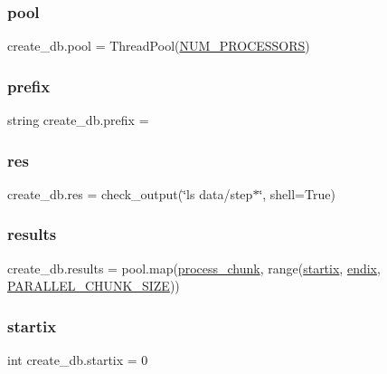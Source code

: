\subsubsection{\texorpdfstring{pool}{pool}}
{\footnotesize\ttfamily create\+\_\+db.\+pool = Thread\+Pool(\hyperlink{namespacecreate__db_a2da1873dcc0f1772f769b24a8afb0cc9}{N\+U\+M\+\_\+\+P\+R\+O\+C\+E\+S\+S\+O\+RS})}

\mbox{\label{namespacecreate__db_a3618610b83bddd5732bbdb1707b93c54}} 
\subsubsection{\texorpdfstring{prefix}{prefix}}
{\footnotesize\ttfamily string create\+\_\+db.\+prefix = \textquotesingle{}\textquotesingle{}}

\mbox{\label{namespacecreate__db_aa349dd30992f59754d744dd90a252664}} 
\subsubsection{\texorpdfstring{res}{res}}
{\footnotesize\ttfamily create\+\_\+db.\+res = check\+\_\+output(\char`\"{}ls data/step$\ast$\char`\"{}, shell=True)}

\mbox{\label{namespacecreate__db_a7926ceddf2e86e190ed055e87168b4d5}} 
\subsubsection{\texorpdfstring{results}{results}}
{\footnotesize\ttfamily create\+\_\+db.\+results = pool.\+map(\hyperlink{namespacecreate__db_a0db532a727d6ffe9852f154e5d148a06}{process\+\_\+chunk}, range(\hyperlink{namespacecreate__db_aa299b331ef2c005b58a6f17618a9ea8e}{startix}, \hyperlink{namespacecreate__db_a293646c9cd089d3131426e96b401b18e}{endix}, \hyperlink{namespacecreate__db_af0cf695fe45d12d416c1722b2fd80b0c}{P\+A\+R\+A\+L\+L\+E\+L\+\_\+\+C\+H\+U\+N\+K\+\_\+\+S\+I\+ZE}))}

\mbox{\label{namespacecreate__db_aa299b331ef2c005b58a6f17618a9ea8e}} 
\subsubsection{\texorpdfstring{startix}{startix}}
{\footnotesize\ttfamily int create\+\_\+db.\+startix = 0}

